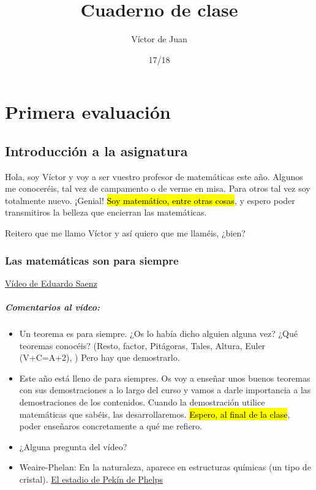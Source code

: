 \documentclass[palatino,nosec]{Docencia}
\title{Cuaderno de clase}
\author{Víctor de Juan}
\date{17/18}
\begin{document}
\pagestyle{plain}
\maketitle
\tableofcontents



\chapter{Primera evaluación}

\section{Introducción a la asignatura}


Hola, soy Víctor y voy a ser vuestro profesor de matemáticas este año. Algunos me conoceréis, tal vez de campamento o de verme en misa. Para otros tal vez soy totalmente nuevo. ¡Genial! \hl{Soy matemático, entre otras cosas}, y espero poder transmitiros la belleza que encierran las matemáticas.

Reitero que me llamo Víctor y así quiero que me llaméis, ¿bien?

\subsection{Las matemáticas son para siempre}

\href{https://www.ted.com/talks/eduardo_saenz_de_cabezon_math_is_forever}{Vídeo de Eduardo Saenz}

\paragraph{Comentarios al vídeo:}

\begin{itemize}
\item Un teorema es para siempre. ¿Os lo había dicho alguien alguna vez? ¿Qué teoremas conocéis? (Resto, factor, Pitágoras, Tales,  Altura, Euler (V+C=A+2),  ) Pero hay que demostrarlo.
\item Este año está lleno de para siempres. Os voy a enseñar unos buenos teoremas con sus demostraciones a lo largo del curso y vamos a darle importancia a las demostraciones de los contenidos. Cuando la demostración utilice matemáticas que sabéis, las desarrollaremos. 
\subitem \hl{Espero, al final de la clase}, poder enseñaros concretamente a qué me refiero.
\item ¿Alguna pregunta del vídeo? 
\item Weaire-Phelan:
\subitem En la naturaleza, aparece en estructuras químicas (un tipo de cristal).
\subitem \href{https://www.e-architect.co.uk/images/jpgs/beijing/watercube_ptw051208_7.jpg}{El estadio de Pekín de Phelps}
\end{itemize}
\end{document}
